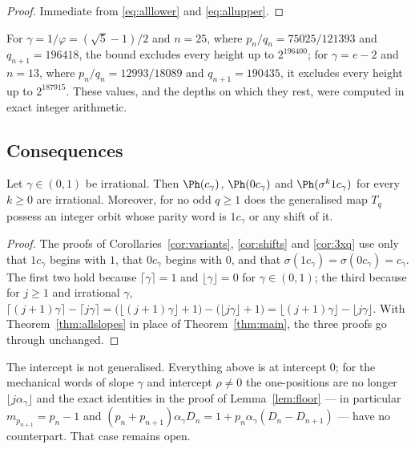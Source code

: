 \begin{proof}
Immediate from \eqref{eq:alllower} and \eqref{eq:allupper}.
\end{proof}

\noindent For $\gamma=1/\varphi=(\sqrt5-1)/2$ and $n=25$, where
$p_n/q_n=75025/121393$ and $q_{n+1}=196418$, the bound excludes every height up
to $2^{196400}$; for $\gamma=e-2$ and $n=13$, where $p_n/q_n=12993/18089$ and
$q_{n+1}=190435$, it excludes every height up to $2^{187915}$. These values,
and the depths on which they rest, were computed in exact integer arithmetic.

\subsection*{Consequences}

\begin{corollary}\label{cor:allvariants}
Let $\gamma\in(0,1)$ be irrational. Then $\Ph(c_\gamma)$, $\Ph(0c_\gamma)$ and
$\Ph(\sigma^{k}1c_\gamma)$ for every $k\ge0$ are irrational. Moreover, for no
odd $q\ge1$ does the generalised map $T_q$ possess an integer orbit whose parity
word is $1c_\gamma$ or any shift of it.
\end{corollary}

\begin{proof}
The proofs of Corollaries~\ref{cor:variants}, \ref{cor:shifts} and
\ref{cor:3xq} use only that $1c_\gamma$ begins with $1$, that $0c_\gamma$ begins
with $0$, and that $\sigma(1c_\gamma)=\sigma(0c_\gamma)=c_\gamma$. The first two
hold because $\lceil\gamma\rceil=1$ and $\lfloor\gamma\rfloor=0$ for
$\gamma\in(0,1)$; the third because for $j\ge1$ and irrational $\gamma$,
$\lceil(j+1)\gamma\rceil-\lceil j\gamma\rceil
=\bigl(\lfloor(j+1)\gamma\rfloor+1\bigr)-\bigl(\lfloor j\gamma\rfloor+1\bigr)
=\lfloor(j+1)\gamma\rfloor-\lfloor j\gamma\rfloor$. With
Theorem~\ref{thm:allslopes} in place of Theorem~\ref{thm:main}, the three proofs
go through unchanged.
\end{proof}

\begin{remark}
The intercept is not generalised. Everything above is at intercept $0$; for the
mechanical words of slope $\gamma$ and intercept $\rho\ne0$ the one-positions
are no longer $\lfloor j\alpha_\gamma\rfloor$ and the exact identities in the
proof of Lemma~\ref{lem:floor} --- in particular
$m_{p_{n+1}}=p_n-1$ and
$(p_n+p_{n+1})\alpha_\gamma D_n=1+p_n\alpha_\gamma(D_n-D_{n+1})$ --- have no
counterpart. That case remains open.
\end{remark}
